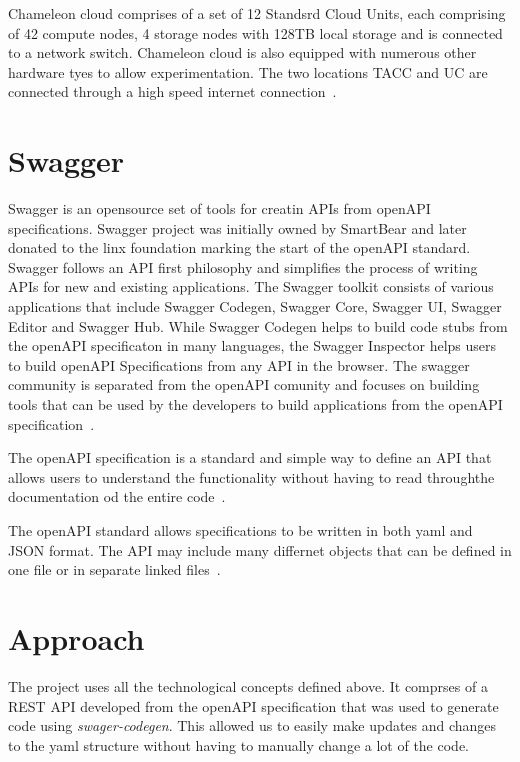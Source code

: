 Chameleon cloud comprises of a set of 12 Standsrd Cloud Units, each
comprising of 42 compute nodes, 4 storage nodes with 128TB local
storage and is connected to a network switch. Chameleon cloud is also
equipped with numerous other hardware tyes to allow
experimentation. The two locations TACC and UC are connected through a
high speed internet connection~\cite{hid-sp18-503-handbook}.

\section{Swagger}
Swagger is an opensource set of tools for creatin APIs from openAPI
specifications. Swagger project was initially owned by SmartBear and
later donated to the linx foundation marking the start of the openAPI
standard. Swagger follows an API first philosophy and simplifies the
process of writing APIs for new and existing applications.
The Swagger
toolkit consists of various applications that include Swagger Codegen,
Swagger Core, Swagger UI, Swagger Editor and Swagger Hub. While
Swagger Codegen helps to build code stubs from the openAPI
specificaton in many languages, the Swagger Inspector helps users to build
openAPI Specifications from any API in the browser.
The swagger community is separated from the openAPI comunity and
focuses on building tools that can be used by the developers to build
applications from the openAPI specification~\cite{hid-sp18-503-swagger}.

The openAPI specification is a standard and simple way to define an
API that allows users to understand the functionality without having
to read throughthe documentation od the entire
code~\cite{hid-sp18-503-swagger-openapi}.

The openAPI standard allows specifications to be written in both yaml
and JSON format. The API may include many differnet objects that can
be defined in one file or in separate linked
files~\cite{hid-sp18-503-swagger-openapi}.

\section{Approach}

The project uses all the technological concepts defined above. It
comprses of a REST API developed from the openAPI specification that
was used to generate code using \emph{swager-codegen}. This allowed us
to easily make updates and changes to the yaml structure without
having to manually change a lot of the code.

